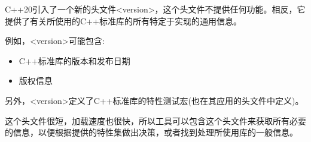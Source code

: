 C++20引入了一个新的头文件<version>，这个头文件不提供任何功能。相反，它提供了有关所使用的C++标准库的所有特定于实现的通用信息。

例如，<version>可能包含:

\begin{itemize}
\item
C++标准库的版本和发布日期

\item
版权信息
\end{itemize}


另外，<version>定义了C++标准库的特性测试宏(也在其应用的头文件中定义)。

这个头文件很短，加载速度也很快，所以工具可以包含这个头文件来获取所有必要的信息，以便根据提供的特性集做出决策，或者找到处理所使用库的一般信息。







